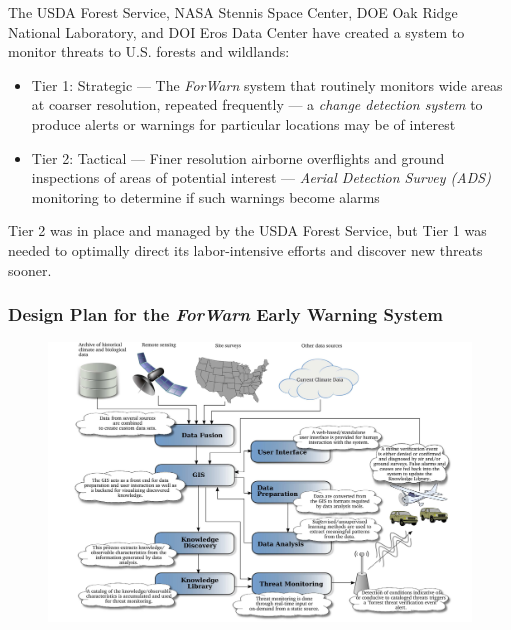\begin{frame}
\begin{figure}
 \end{figure}
 \vskip-0.1in
  The USDA Forest Service, NASA Stennis Space Center, DOE Oak Ridge National Laboratory, and DOI Eros Data Center have created a system to monitor threats to U.S. forests and wildlands:
 \begin{itemize}
  \item {\color{red}Tier 1: Strategic} --- The \emph{ForWarn} system that routinely monitors wide areas at coarser resolution, repeated frequently --- a \emph{change detection system} to produce alerts or warnings for particular locations may be of interest
  \item{\color{red}Tier 2: Tactical} --- Finer resolution airborne overflights and ground inspections of areas of potential interest --- \emph{Aerial Detection Survey (ADS)} monitoring to determine if such warnings become alarms
 \end{itemize}
 Tier 2 was in place and managed by the USDA Forest Service, but Tier 1 was needed to optimally direct its labor-intensive efforts and discover new threats sooner.
\end{frame}

\begin{frame}
 \frametitle{Design Plan for the \textit{ForWarn} Early Warning System}
 \begin{figure}
  \begin{center}
   \includegraphics[width=\textwidth]{figures/EWS}
  \end{center}
  \label{fig:EWS}
 \end{figure}
\end{frame}

